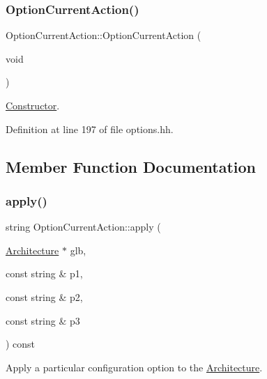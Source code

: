 \subsubsection{\texorpdfstring{OptionCurrentAction()}{OptionCurrentAction()}}
{\footnotesize\ttfamily Option\+Current\+Action\+::\+Option\+Current\+Action (\begin{DoxyParamCaption}\item[{void}]{ }\end{DoxyParamCaption})\hspace{0.3cm}{\ttfamily [inline]}}



\mbox{\hyperlink{class_constructor}{Constructor}}. 



Definition at line 197 of file options.\+hh.



\subsection{Member Function Documentation}
\mbox{\label{class_option_current_action_abb1f2fb22f75d2c3da60a9e7ac6e6ef6}} 
\subsubsection{\texorpdfstring{apply()}{apply()}}
{\footnotesize\ttfamily string Option\+Current\+Action\+::apply (\begin{DoxyParamCaption}\item[{\mbox{\hyperlink{class_architecture}{Architecture}} $\ast$}]{glb,  }\item[{const string \&}]{p1,  }\item[{const string \&}]{p2,  }\item[{const string \&}]{p3 }\end{DoxyParamCaption}) const\hspace{0.3cm}{\ttfamily [virtual]}}



Apply a particular configuration option to the \mbox{\hyperlink{class_architecture}{Architecture}}. 

